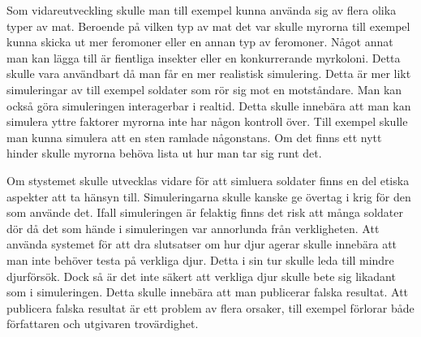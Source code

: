 \documentclass[12pt]{article}
\begin{document}
Som vidareutveckling skulle man till exempel kunna använda sig av flera olika typer av mat.
Beroende på vilken typ av mat det var skulle myrorna till exempel kunna skicka ut mer feromoner eller en annan typ av feromoner.
Något annat man kan lägga till är fientliga insekter eller en konkurrerande myrkoloni.
Detta skulle vara användbart då man får en mer realistisk simulering.
Detta är mer likt simuleringar av till exempel soldater som rör sig mot en motståndare.
Man kan också göra simuleringen interagerbar i realtid.
Detta skulle innebära att man kan simulera yttre faktorer myrorna inte har någon kontroll över.
Till exempel skulle man kunna simulera att en sten ramlade någonstans.
Om det finns ett nytt hinder skulle myrorna behöva lista ut hur man tar sig runt det.

Om stystemet skulle utvecklas vidare för att simluera soldater finns en del etiska aspekter att ta hänsyn till.
Simuleringarna skulle kanske ge övertag i krig för den som använde det.
Ifall simuleringen är felaktig finns det risk att många soldater dör då det som hände i simuleringen var annorlunda från verkligheten.
Att använda systemet för att dra slutsatser om hur djur agerar skulle innebära att man inte behöver testa på verkliga djur.
Detta i sin tur skulle leda till mindre djurförsök.
Dock så är det inte säkert att verkliga djur skulle bete sig likadant som i simuleringen.
Detta skulle innebära att man publicerar falska resultat.
Att publicera falska resultat är ett problem av flera orsaker, 
till exempel förlorar både författaren och utgivaren trovärdighet.



\end{document}
